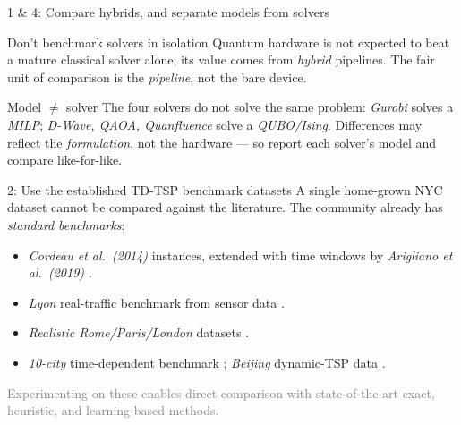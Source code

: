 \documentclass[
11pt,notheorems,hyperref={pdfauthor=Alma Arevalo Loyola}
]{beamer}
\renewcommand{\emphasize}[1]{\textcolor{emphasisblue}{\textit{#1}}}
\newcommand{\emphteal}[1]{\textcolor{emphasisteal}{\textit{#1}}}
\begin{document}
\begin{frame}{1 \& 4: Compare hybrids, and separate models from solvers}
  \small
  \begin{block}{Don't benchmark solvers in isolation}
    Quantum hardware is \alert{not} expected to beat a mature classical solver alone; its value comes from \emphasize{hybrid} pipelines. The fair unit of comparison is the \emphteal{pipeline}, not the bare device.
  \end{block}
  \begin{block}{Model $\neq$ solver}
    The four solvers do not solve the same problem: \emphteal{Gurobi} solves a \emphasize{MILP}; \emphteal{D-Wave, QAOA, Quanfluence} solve a \emphasize{QUBO/Ising}. Differences may reflect the \emphasize{formulation}, not the hardware --- so report each solver's model and compare like-for-like.
  \end{block}
\end{frame}

\begin{frame}{2: Use the established TD-TSP benchmark datasets}
  \small
  A single home-grown NYC dataset cannot be compared against the literature. The community already has \emphasize{standard benchmarks}:
  \begin{itemize}
    \item \emphteal{Cordeau et al.\ (2014)} instances, extended with time windows by \emphteal{Arigliano et al.\ (2019)} \cite{cordeau2014analysis,arigliano2019time}.
    \item \emphteal{Lyon} real-traffic benchmark from sensor data \cite{aguiar2015time}.
    \item \emphteal{Realistic Rome/Paris/London} datasets \cite{tdrouting}.
    \item \emphteal{10-city} time-dependent benchmark \cite{blauth2024vehicle}; \emphteal{Beijing} dynamic-TSP data \cite{zhang2023solving}.
  \end{itemize}
  \vspace{0.3em}
  \textcolor{gray}{Experimenting on these enables direct comparison with state-of-the-art exact, heuristic, and learning-based methods.}
\end{frame}
\end{document}
